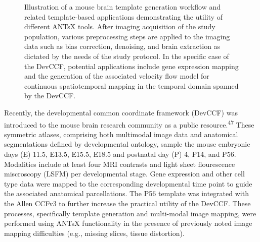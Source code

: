 \documentclass[
  12pt,
]{article}
\begin{document}
\begin{figure}[!htb]
\centering
{}%
\caption{Illustration of a mouse brain template generation workflow and 
related template-based applications demonstrating the utility of different ANTsX
tools.  After imaging acquisition of the study population, various preprocessing
steps are applied to the imaging data such as bias correction, denoising, and
brain extraction as dictated by the needs of the study protocol.  In the specific 
case of the DevCCF, potential applications include gene expression mapping and the 
generation of the associated velocity flow model for continuous spatiotemporal 
mapping in the temporal domain spanned by the DevCCF.}
\label{fig:pipeline}
\end{figure}

Recently, the developmental common coordinate framework (DevCCF) was
introduced to the mouse brain research community as a public
resource.\textsuperscript{47} These symmetric atlases, comprising both
multimodal image data and anatomical segmentations defined by
developmental ontology, sample the mouse embryonic days (E) 11.5, E13.5,
E15.5, E18.5 and postnatal day (P) 4, P14, and P56. Modalities include
at least four MRI contrasts and light sheet flourescence miscroscopy
(LSFM) per developmental stage. Gene expression and other cell type data
were mapped to the corresponding developmental time point to guide the
associated anatomical parcellations. The P56 template was integrated
with the Allen CCFv3 to further increase the practical utility of the
DevCCF. These processes, specifically template generation and
multi-modal image mapping, were performed using ANTsX functionality in
the presence of previously noted image mapping difficulties (e.g.,
missing slices, tissue distortion).
\end{document}

